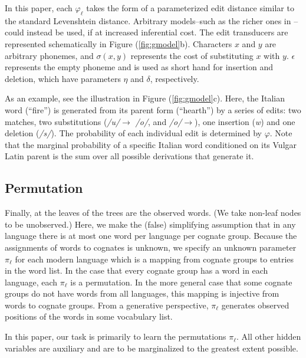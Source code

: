 \documentclass[11pt,a4paper]{article}
\begin{document}
In this paper, each $\varphi_\ell$ takes the form of a parameterized
edit distance similar to the standard Levenshtein distance.  Arbitrary
models--such as the richer ones in --could
instead be used, if at increased inferential cost.   The edit
transducers are represented schematically in Figure (\ref{fig:gmodel}b).
Characters $x$ and $y$ are arbitrary phonemes, and $\sigma(x,y)$
represents the cost of substituting $x$ with $y$.  $\epsilon$
represents the empty phoneme and is used as short hand for insertion
and deletion, which have parameters $\eta$ and $\delta$, respectively.

As an example, see the illustration in Figure (\ref{fig:gmodel}c).
Here, the Italian word \textit{} (``fire'') is
generated from its parent form \textit{} (``hearth'')
by a series of edits: two matches, two substitutions (\textit{/u/}$\to$
\textit{/o/}, and \textit{/o/}$\to$\textit{}), one
insertion (\textit{w}) and one deletion (\textit{/s/}).  The
probability of each individual edit is determined by $\varphi$.
Note that the marginal probability of a specific Italian word
conditioned on its Vulgar Latin parent is the sum over all possible
derivations that generate it.

\subsection{Permutation}

Finally, at the leaves of the trees are the observed words. (We
take non-leaf nodes to be unobserved.) Here, we make the (false)
simplifying assumption that in any language there is at most one
word per language per cognate group. Because the assignments of
words to cognates is unknown, we specify an unknown parameter
$\pi_\ell$ for each modern language which is a mapping from cognate
groups to entries in the word list. In the case that every cognate
group has a word in each language, each $\pi_\ell$ is a permutation.
In the more general case that some cognate groups do not have words
from all languages, this mapping is injective from words to cognate
groups. From a generative perspective, $\pi_\ell$ generates observed
positions of the words in some vocabulary list.

In this paper, our task is primarily to learn the permutations
$\pi_\ell$. All other hidden variables are auxiliary and are to be
marginalized to the greatest extent possible.
\end{document}
